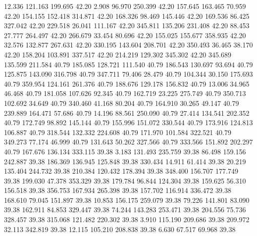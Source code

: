   12.336  121.163  199.695        42.20
   2.908   96.970  250.399        42.20
 157.645  163.465   70.959        42.20
 154.155  152.418  314.871        42.20
 168.326   98.469  145.446        42.20
 169.536   86.425  327.042        42.20
 229.518   26.041  111.167        42.20
 345.811  135.206  231.408        42.20
  88.453   27.777  264.497        42.20
 266.679   33.454   80.696        42.20
 155.025  155.677  358.935        42.20
  32.576  132.877  267.631        42.20
 330.195  143.604  208.701        42.20
 350.493   36.465   38.170        42.20
 158.204  103.891  337.517        42.20
 214.219  129.302  345.302        42.20
 345.689  135.599  211.584        40.79
 185.085  128.721  111.540        40.79
 186.543  130.697   93.694        40.79
 125.875  143.090  316.798        40.79
 347.711   79.406   28.479        40.79
 104.344   30.150  175.693        40.79
 359.954  124.161  261.376        40.79
 188.676  129.178  156.832        40.79
  13.006   34.965   46.468        40.79
 181.058  107.626   92.345        40.79
 162.719   23.225  275.749        40.79
 350.713  102.692   34.649        40.79
 340.460   41.168   80.204        40.79
 164.910   30.265   49.147        40.79
 239.889  164.471   57.686        40.79
  14.196   88.561  250.090        40.79
  27.414  134.541  202.352        40.79
 172.749   98.892  145.144        40.79
 155.996  151.072  330.544        40.79
 173.916  124.813  106.887        40.79
 318.544  132.332  224.608        40.79
 171.970  101.584  322.521        40.79
 349.273   77.174   46.999        40.79
 131.643   50.262  327.566        40.79
 333.566  151.892  202.297        40.79
 167.676  136.134  333.115        39.38
   3.183  131.493  235.759        39.38
  86.498  159.156  242.887        39.38
 186.369  136.945  125.848        39.38
 330.434   14.911   61.414        39.38
  20.219  135.404  244.732        39.38
 210.384  120.432  178.394        39.38
 348.400  156.707  177.749        39.38
 199.030   47.378  353.329        39.38
 179.784   96.844  124.304        39.38
 159.625   56.310  156.518        39.38
 356.753  167.934  265.398        39.38
 157.702  116.914  336.472        39.38
 168.610   79.045  151.897        39.38
  10.853  156.175  259.079        39.38
  79.226  141.801   83.090        39.38
 162.911   84.853  329.447        39.38
  74.244  143.283  253.471        39.38
 204.556   75.736  328.457        39.38
 315.068  121.482  220.302        39.38
   3.910  115.190  209.686        39.38
 209.972   32.113  342.819        39.38
  12.115  105.210  208.838        39.38
   6.630   67.517   69.968        39.38
